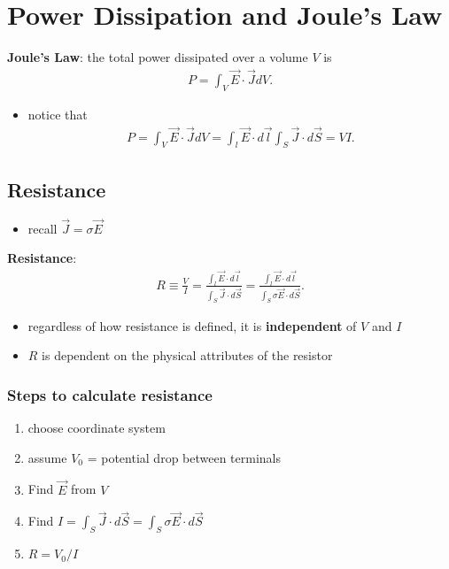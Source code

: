 \documentclass[10pt]{article}
\begin{document}
\section{Power Dissipation and Joule's Law}
\begin{theorem}
    \textbf{Joule's Law}: the total power dissipated over a volume $V$ is 
    \begin{gather*}
        P = \int_{V} \vec{E} \cdot \vec{J} dV   
    .\end{gather*}
    \begin{itemize}
        \item notice that
            \begin{gather*}
                P = \int_{V} \vec{E} \cdot \vec{J} dV = \int_{l} \vec{E} \cdot d\vec{l} \int_{S} \vec{J} \cdot d\vec{S} = VI    
            .\end{gather*}
    \end{itemize}
\end{theorem}
\subsection{Resistance}
\begin{itemize}
    \item recall $\vec{J} = \sigma \vec{E} $
\end{itemize}
\begin{definition}
    \textbf{Resistance}:
    \begin{gather*}
        R \equiv \frac{V}{I} = \frac{\int_{l} \vec{E} \cdot d\vec{l}}{\int_{S} \vec{J} \cdot d\vec{S}} = \frac{\int_{l} \vec{E} \cdot d\vec{l}}{\int_{S} \sigma \vec{E} \cdot d\vec{S}}
    .\end{gather*}
    \begin{itemize}
        \item regardless of how resistance is defined, it is \textbf{independent} of $V$ and $I$ 
        \item $R$ is dependent on the physical attributes of the resistor
    \end{itemize}
\end{definition}
\subsubsection*{Steps to calculate resistance}
\begin{enumerate}
    \item choose coordinate system
    \item assume $V_0$ = potential drop between terminals 
    \item Find $\vec{E}$ from $V$
    \item Find $I = \int_{S} \vec{J} \cdot d\vec{S} = \int_{S} \sigma \vec{E} \cdot d\vec{S}$
    \item $R = V_0 / I$
\end{enumerate}
\end{document}

